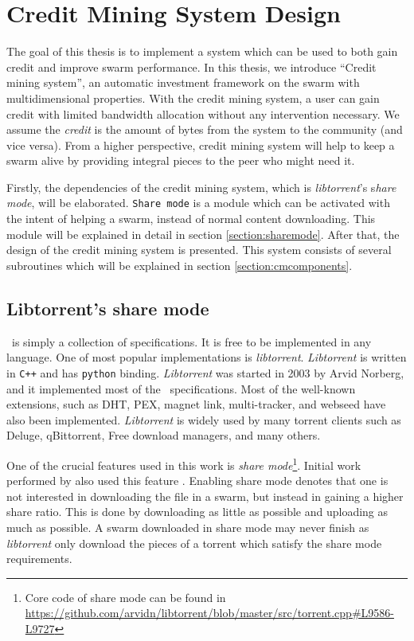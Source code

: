 \chapter{Credit Mining System Design}
\label{chp:design}

The goal of this thesis is to implement a system which can be used to both gain credit and improve swarm performance. In this thesis, we introduce ``Credit mining system'', an automatic investment framework on the swarm with multidimensional properties. With the credit mining system, a user can gain credit with limited bandwidth allocation without any intervention necessary. We assume the \textit{credit} is the amount of bytes from the system to the community (and vice versa). From a higher perspective, credit mining system will help to keep a swarm alive by providing integral pieces to the peer who might need it. 

Firstly, the dependencies of the credit mining system, which is \textit{libtorrent}'s s\textit{hare mode}, will be elaborated. \texttt{Share mode} is a module which can be activated with the intent of helping a swarm, instead of normal content downloading. This module will be explained in detail in section \ref{section:sharemode}. After that, the design of the credit mining system is presented. This system consists of several subroutines which will be explained in section \ref{section:cmcomponents}. 

\section{Libtorrent's share mode}
\label{section:libtorrent}
\label{section:sharemode}
\bt~is simply a collection of specifications. It is free to be implemented in any language. One of most popular implementations is \textit{libtorrent}. \textit{Libtorrent} is written in \texttt{C++} and  has \texttt{python} binding. \textit{Libtorrent} was started in 2003 by Arvid Norberg, and it implemented most of the \bt~specifications. Most of the well-known extensions, such as DHT, PEX, magnet link, multi-tracker, and webseed have also been implemented. \textit{Libtorrent} is widely used by many torrent clients such as Deluge, qBittorrent, Free download managers, and many others.

One of the crucial features used in this work is \textit{share mode}\footnote{Core code of share mode can be found in \url{https://github.com/arvidn/libtorrent/blob/master/src/torrent.cpp\#L9586-L9727}}. Initial work performed by \citeauthor{2015:creditmining:capota} also used this feature \cite{2015:creditmining:capota}. Enabling share mode denotes that one is not interested in downloading the file in a swarm, but instead in gaining a higher share ratio. This is done by downloading as little as possible and uploading as much as possible. A swarm downloaded in share mode may never finish as \textit{libtorrent} only download the pieces of a torrent which satisfy the share mode requirements.

